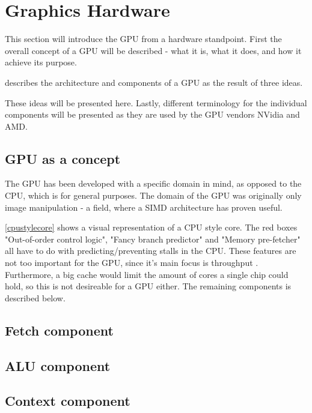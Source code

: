\section{Graphics Hardware}\label{sec:graphics_hardware}




\begin{sectionmeta}
	
	This section will introduce the \gls{GPU} from a hardware standpoint. 
	First the overall concept of a \gls{GPU} will be described - what it is, what it does, and how it achieve its purpose.
	
	\cite{intro_to_gpu_arch} describes the architecture and components of a \gls{GPU} as the result of three ideas.
	
	These ideas will be presented here.
	Lastly, different terminology for the individual components will be presented as they are used by the \gls{GPU} vendors NVidia and AMD.  
	
\end{sectionmeta}


\subsection{\gls{GPU} as a concept}
The \gls{GPU} has been developed with a specific domain in mind, as opposed to the CPU, which is for general purposes. 
The domain of the \gls{GPU} was originally only image manipulation - a field, where a \gls{SIMD} architecture has proven useful.


\ref{cpustylecore} shows a visual representation of a \gls{CPU} style core. 
The red boxes "Out-of-order control logic", "Fancy branch predictor" and "Memory pre-fetcher" all have to do with predicting/preventing stalls in the \gls{CPU}.
These features are not too important for the \gls{GPU}, since it's main focus is throughput . 
Furthermore, a big cache would limit the amount of cores a single chip could hold, so this is not desireable for a \gls{GPU} either.
The remaining components is described below.




\subsection{Fetch component}

\subsection{ALU component}

\subsection{Context component}